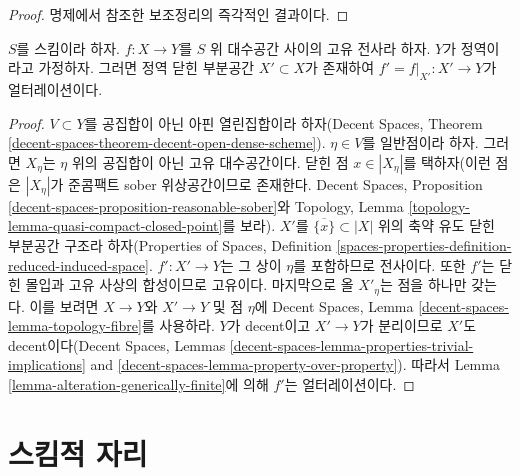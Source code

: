 \begin{proof}
명제에서 참조한 보조정리의 즉각적인 결과이다.
\end{proof}

\begin{lemma}
\label{lemma-alteration-contained-in}
$S$를 스킴이라 하자. $f : X \to Y$를 $S$ 위 대수공간 사이의 고유
전사라 하자. $Y$가 정역이라고 가정하자. 그러면 정역 닫힌 부분공간
$X' \subset X$가 존재하여 $f' = f|_{X'} : X' \to Y$가 얼터레이션이다.
\end{lemma}

\begin{proof}
$V \subset Y$를 공집합이 아닌 아핀 열린집합이라 하자(Decent Spaces,
Theorem \ref{decent-spaces-theorem-decent-open-dense-scheme}).
$\eta \in V$를 일반점이라 하자. 그러면 $X_\eta$는 $\eta$ 위의 공집합이
아닌 고유 대수공간이다. 닫힌 점 $x \in |X_\eta|$를 택하자(이런 점은
$|X_\eta|$가 준콤팩트 sober 위상공간이므로 존재한다. Decent Spaces,
Proposition \ref{decent-spaces-proposition-reasonable-sober}와 Topology,
Lemma \ref{topology-lemma-quasi-compact-closed-point}를 보라).
$X'$를 $\overline{\{x\}} \subset |X|$ 위의 축약 유도 닫힌 부분공간
구조라 하자(Properties of Spaces, Definition
\ref{spaces-properties-definition-reduced-induced-space}.
$f' : X' \to Y$는 그 상이 $\eta$를 포함하므로 전사이다. 또한 $f'$는
닫힌 몰입과 고유 사상의 합성이므로 고유이다. 마지막으로 올
$X'_\eta$는 점을 하나만 갖는다. 이를 보려면 $X \to Y$와
$X' \to Y$ 및 점 $\eta$에 Decent Spaces, Lemma
\ref{decent-spaces-lemma-topology-fibre}를 사용하라. $Y$가 decent이고
$X' \to Y$가 분리이므로 $X'$도 decent이다(Decent Spaces, Lemmas
\ref{decent-spaces-lemma-properties-trivial-implications} and
\ref{decent-spaces-lemma-property-over-property}). 따라서 Lemma
\ref{lemma-alteration-generically-finite}에 의해 $f'$는 얼터레이션이다.
\end{proof}







\section{스킴적 자리}
\label{section-schematic}

